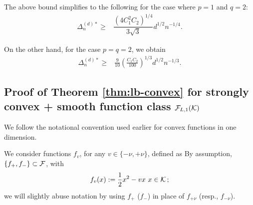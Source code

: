 The above bound simplifies to the following for the case where $p=1$ and $q=2$:
\begin{align*}
\Delta_n^{(d)*}  \ge& \dfrac{ (4C_1^2C_2)^{1/4}}{3\sqrt{3}} d^{1/2}n^{-1/4}.
\end{align*}

On the other hand, for the case $p=q=2$, we obtain
\begin{align*}
\Delta_n^{(d)*}  \ge& \frac{9}{10}\left(\frac{C_1 C_2}{100}\right)^{1/3} d^{1/2}n^{-1/3}.
\end{align*}

\subsection{Proof of Theorem \ref{thm:lb-convex} for strongly convex + smooth function class $\mathcal{F}_{L,1}(\mathcal{K})$}
\label{sec:appendix-lbscconvex}
We follow the notational convention used earlier for convex functions in one dimension. 

We consider functions $f_v$, for any $v \in \{-\nu,+\nu\}$, defined as
By assumption,  $\{f_+, f_-\}\subset \mathcal{F}$, with 
\begin{align*}
  f_v(x) := \dfrac{1}{2} x^2 - v x \,\, x \in \mathcal{K}\,;
\end{align*}
we will slightly abuse notation by using $f_+$ ($f_-$) in place of $f_{+\nu}$ (resp., $f_{-\nu}$).

